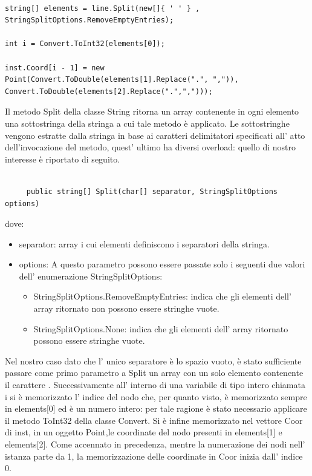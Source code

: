 \documentclass[11pt]{article}
\begin{document}
\begin{lstlisting}

string[] elements = line.Split(new[]{ ' ' } , StringSplitOptions.RemoveEmptyEntries);

int i = Convert.ToInt32(elements[0]);

inst.Coord[i - 1] = new Point(Convert.ToDouble(elements[1].Replace(".", ",")), Convert.ToDouble(elements[2].Replace(".",",")));
\end{lstlisting}

Il metodo Split della classe String ritorna un array contenente in ogni elemento una sottostringa della stringa a cui tale metodo \`e applicato. Le sottostringhe vengono estratte dalla stringa in base ai caratteri delimitatori specificati all' atto dell'invocazione del metodo, quest' ultimo ha diversi overload: quello di nostro interesse \`e riportato di seguito.

\begin{lstlisting}

     public string[] Split(char[] separator, StringSplitOptions options)

\end{lstlisting}

dove:

\begin{itemize}
\item separator: array i cui elementi definiscono i separatori della stringa. 
\item options: A questo parametro possono essere passate solo i seguenti due valori dell' enumerazione StringSplitOptions:

\begin{itemize}

\item StringSplitOptions.RemoveEmptyEntries: indica che gli elementi dell' array ritornato non possono essere stringhe vuote.
\item StringSplitOptions.None: indica che gli elementi dell' array ritornato possono essere stringhe vuote.

\end{itemize}

\end{itemize}

Nel nostro caso dato che l' unico separatore \`e lo spazio vuoto, \`e stato sufficiente passare come primo parametro a Split un array con un solo elemento contenente il carattere    .
Successivamente all' interno di una variabile di tipo intero chiamata i si \`e memorizzato l' indice del nodo che, per quanto visto, \`e memorizzato sempre in elements[0] ed \`e un numero intero: per tale ragione \`e stato necessario applicare il metodo ToInt32 della classe Convert.
Si \`e infine memorizzato nel vettore Coor di inst, in un oggetto Point,le coordinate del nodo presenti in elements[1] e elements[2]. Come accennato in precedenza, mentre la numerazione dei nodi nell' istanza parte da 1, la memorizzazione delle coordinate in Coor inizia dall' indice 0.
\end{document}
